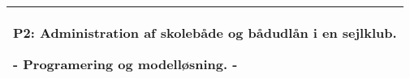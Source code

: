 


%
%
%
%
\thispagestyle{empty}
%
  \addtolength{\hoffset}{0.5\evensidemargin-0.5\oddsidemargin} %
  \noindent%
  \begin{tabular}{@{}p{\textwidth}@{}}
    \toprule[2pt]
    \midrule
    \vspace{0.2cm}
    \begin{center}
    \Huge{\textbf{
      P2: Administration af skolebåde og bådudlån i en sejlklub.%
    }}
    \end{center}
    \begin{center}
      \Large{
        - Programering og modelløsning. -%
      }
    \end{center}
    \vspace{0.2cm}\\
    \midrule
    \toprule[2pt]
  \end{tabular}
  \vspace{4 cm}
